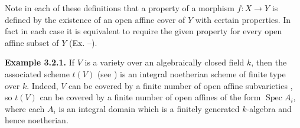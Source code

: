 {Note in each of these definitions that a property of a morphism $f\colon X\to Y$ is defined by the existence of an open affine cover of $Y$ with certain properties. In fact in each case it is equivalent to require the given property for every open affine subset of $Y$ (Ex. --).

\medskip
\noindent\hypertarget{result-II-3.2.1}{}\textbf{Example 3.2.1.} If $V$ is a variety over an algebraically closed field $k$, then the associated scheme $t(V)$ (see ) is an integral noetherian scheme of finite type over $k$. Indeed, $V$ can be covered by a finite number of open affine subvarieties , so $t(V)$ can be covered by a finite number of open affines of the form $\operatorname{Spec}A_i$, where each $A_i$ is an integral domain which is a finitely generated $k$-algebra and hence noetherian.}
